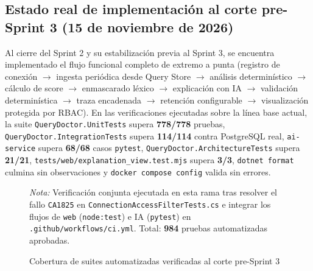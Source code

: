 \documentclass[12pt,a4paper]{article}
\begin{document}
\subsection{Estado real de implementación al corte pre-Sprint 3 (15 de noviembre de 2026)}

Al cierre del Sprint 2 y su estabilización previa al Sprint 3, se encuentra implementado el flujo funcional completo de extremo a punta (registro de conexión $\rightarrow$ ingesta periódica desde Query Store $\rightarrow$ análisis determinístico $\rightarrow$ cálculo de score $\rightarrow$ enmascarado léxico $\rightarrow$ explicación con IA $\rightarrow$ validación determinística $\rightarrow$ traza encadenada $\rightarrow$ retención configurable $\rightarrow$ visualización protegida por RBAC). En las verificaciones ejecutadas sobre la línea base actual, la suite \texttt{QueryDoctor.UnitTests} supera \textbf{778/778} pruebas, \texttt{QueryDoctor.IntegrationTests} supera \textbf{114/114} contra PostgreSQL real, \texttt{ai-service} supera \textbf{68/68} casos \texttt{pytest}, \texttt{QueryDoctor.ArchitectureTests} supera \textbf{21/21}, \texttt{tests/web/explanation\_view.test.mjs} supera \textbf{3/3}, \texttt{dotnet format} culmina sin observaciones y \texttt{docker compose config} valida sin errores.

\begin{figure}[H]
\centering
{}
\par\smallskip
{\scriptsize\textit{Nota:} Verificación conjunta ejecutada en esta rama tras resolver el fallo \texttt{CA1825} en \texttt{ConnectionAccessFilterTests.cs} e integrar los flujos de \texttt{web} (\texttt{node:test}) e IA (\texttt{pytest}) en \texttt{.github/workflows/ci.yml}. Total: \textbf{984} pruebas automatizadas aprobadas.}
\caption{Cobertura de suites automatizadas verificadas al corte pre-Sprint 3}
\label{fig:cobertura-tests}
\end{figure}
\end{document}
